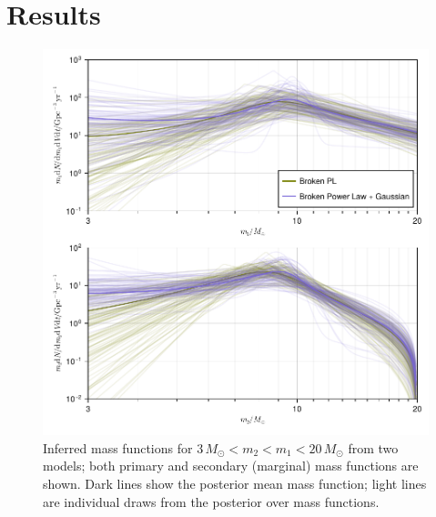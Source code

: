 \documentclass[modern]{aastex631}
\begin{document}
\section{Results}
\label{sec:results}
\begin{figure}
    \includegraphics[width=\columnwidth]{figures/dNdm_traces_including_230529.pdf}
    \caption{\label{fig:dNdm-traces_including_230529} Inferred mass functions for $3 \, M_\odot <
    m_2 < m_1 < 20 \, M_\odot$ from two models; both primary and secondary
    (marginal) mass functions are shown.  Dark lines show the posterior mean
    mass function; light lines are individual draws from the posterior over mass
    functions.}
\end{figure}
\end{document}
